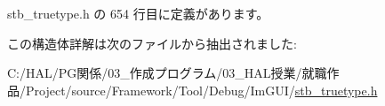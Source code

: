  stb\+\_\+truetype.\+h の 654 行目に定義があります。



この構造体詳解は次のファイルから抽出されました\+:\begin{DoxyCompactItemize}
\item 
C\+:/\+H\+A\+L/\+P\+G関係/03\+\_\+作成プログラム/03\+\_\+\+H\+A\+L授業/就職作品/\+Project/source/\+Framework/\+Tool/\+Debug/\+Im\+G\+U\+I/\mbox{\hyperlink{stb__truetype_8h}{stb\+\_\+truetype.\+h}}\end{DoxyCompactItemize}
